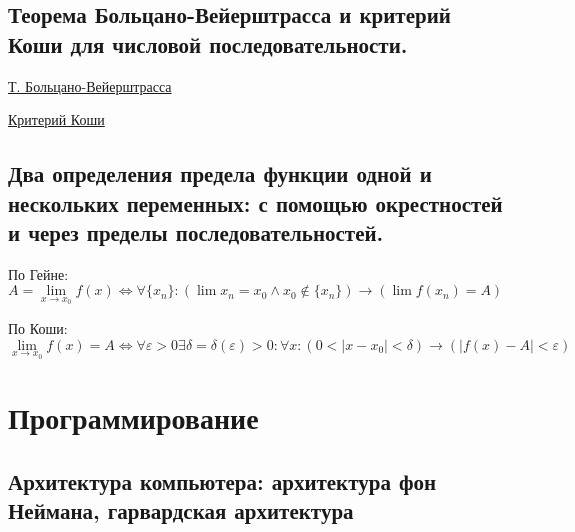 \documentclass{article}
\begin{document}
\subsection{Теорема Больцано-Вейерштрасса и критерий Коши для числовой
последовательности.}


\href{https://ru.wikipedia.org/wiki/%D0%A2%D0%B5%D0%BE%D1%80%D0%B5%D0%BC%D0%B0_%D0%91%D0%BE%D0%BB%D1%8C%D1%86%D0%B0%D0%BD%D0%BE_%E2%80%94_%D0%92%D0%B5%D0%B9%D0%B5%D1%80%D1%88%D1%82%D1%80%D0%B0%D1%81%D1%81%D0%B0}{Т. Больцано-Вейерштрасса}


\href{https://ru.wikipedia.org/wiki/%D0%9A%D1%80%D0%B8%D1%82%D0%B5%D1%80%D0%B8%D0%B9_%D0%9A%D0%BE%D1%88%D0%B8}{Критерий Коши}


\subsection{Два определения предела функции одной и нескольких переменных:
с помощью окрестностей и через пределы последовательностей.}

По Гейне:
$A = \lim\limits_{x \to x_0} f(x) \iff
\forall \{x_n\}: (\lim x_n = x_0 \wedge x_0 \notin \{x_n\})
\rightarrow (\lim f(x_n) = A)$

По Коши:
$\lim\limits_{x \to x_0} f(x) = A \iff
\forall \varepsilon > 0 \exists \delta = \delta(\varepsilon) > 0:
\forall x : (0 < |x - x_0| < \delta) \rightarrow (|f(x) - A| < \varepsilon)$



\section{Программирование}
\subsection{Архитектура компьютера: архитектура фон Неймана, гарвардская
архитектура}
\end{document}

